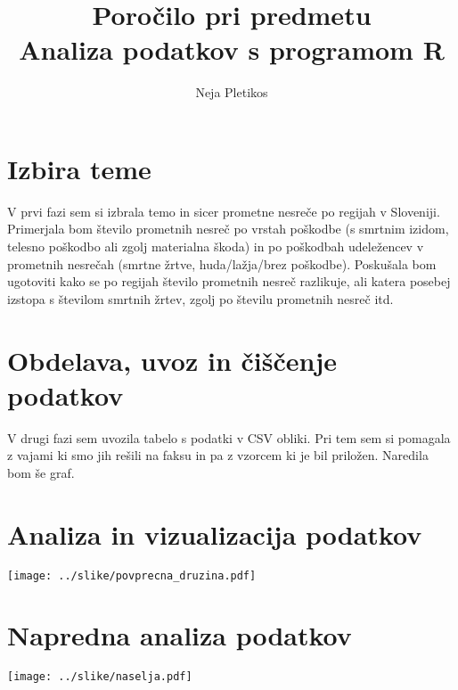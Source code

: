 \documentclass[11pt,a4paper]{article}
\begin{document}
\title{Poročilo pri predmetu \\
Analiza podatkov s programom R}
\author{Neja Pletikos}
\maketitle

\section{Izbira teme}

V prvi fazi sem si izbrala temo in sicer prometne nesreče po regijah v Sloveniji. Primerjala bom število prometnih nesreč po vrstah poškodbe (s smrtnim izidom, telesno poškodbo ali zgolj materialna škoda) in po poškodbah udeležencev v prometnih nesrečah (smrtne žrtve, huda/lažja/brez poškodbe). Poskušala bom ugotoviti kako se po regijah število prometnih nesreč razlikuje, ali katera posebej izstopa s številom smrtnih žrtev, zgolj po številu prometnih nesreč itd.

\section{Obdelava, uvoz in čiščenje podatkov}

V drugi fazi sem uvozila tabelo s podatki v CSV obliki. Pri tem sem si pomagala z vajami ki smo jih rešili na faksu in pa z vzorcem ki je bil priložen. Naredila bom še graf.

\section{Analiza in vizualizacija podatkov}

\texttt{[image: ../slike/povprecna\_druzina.pdf]}

\section{Napredna analiza podatkov}

\texttt{[image: ../slike/naselja.pdf]}
\end{document}
